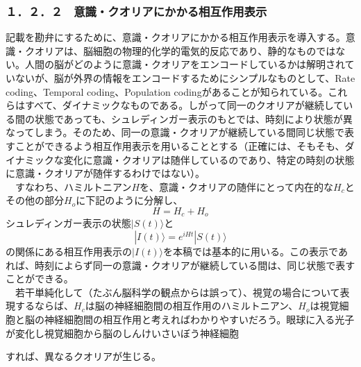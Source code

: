 \subsubsection{１．２．２　意識・クオリアにかかる相互作用表示}
記載を勘弁にするために、意識・クオリアにかかる相互作用表示を導入する。意識・クオリアは、脳細胞の物理的化学的電気的反応であり、静的なものではない。人間の脳がどのように意識・クオリアをエンコードしているかは解明されていないが、脳が外界の情報をエンコードするためにシンプルなものとして、Rate coding、Temporal coding、Population codingがあることが知られている\cite{wikipediac}。これらはすべて、ダイナミックなものである。しがって同一のクオリアが継続している間の状態であっても、シュレディンガー表示のもとでは、時刻により状態が異なってしまう。そのため、同一の意識・クオリアが継続している間同じ状態で表すことができるよう相互作用表示を用いることとする（正確には、そもそも、ダイナミックな変化に意識・クオリアは随伴しているのであり、特定の時刻の状態に意識・クオリアが随伴するわけではない）。\\
　すなわち、ハミルトニアン$H$を、意識・クオリアの随伴にとって内在的な$H_c$とその他の部分$H_o$に下記のように分解し、
　\begin{equation}
  H=H_c + H_o
\end{equation}
シュレディンガー表示の状態$|S(t)\rangle$と
　\begin{equation}
  |I(t)\rangle = e^{iHt}|S(t)\rangle
\end{equation}
の関係にある相互作用表示の$|I(t)\rangle$を本稿では基本的に用いる。この表示であれば、時刻によらず同一の意識・クオリアが継続している間は、同じ状態で表すことができる。\\
　若干単純化して（たぶん脳科学の観点からは誤って）、視覚の場合について表現するならば、$H_c$は脳の神経細胞間の相互作用のハミルトニアン、$H_o$は視覚細胞と脳の神経細胞間の相互作用と考えればわかりやすいだろう。眼球に入る光子が変化し視覚細胞から脳のしんけいさいぼう神経細胞

すれば、異なるクオリアが生じる。